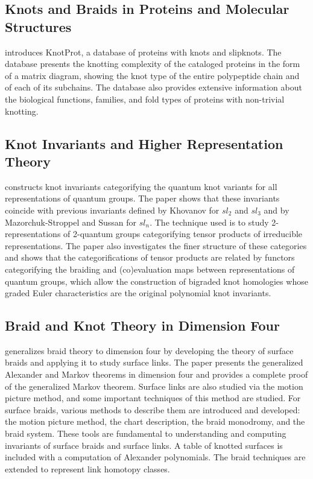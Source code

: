 \documentclass{article}
\begin{document}
\subsection{Knots and Braids in Proteins and Molecular Structures}

\cite{Jamrz2014KnotProtAD} introduces KnotProt, a database of proteins with knots and slipknots. The database presents the knotting complexity of the cataloged proteins in the form of a matrix diagram, showing the knot type of the entire polypeptide chain and of each of its subchains. The database also provides extensive information about the biological functions, families, and fold types of proteins with non-trivial knotting.

\subsection{Knot Invariants and Higher Representation Theory}

\cite{Webster2013KnotIA} constructs knot invariants categorifying the quantum knot variants for all representations of quantum groups. The paper shows that these invariants coincide with previous invariants defined by Khovanov for $sl_2$ and $sl_3$ and by Mazorchuk-Stroppel and Sussan for $sl_n$. The technique used is to study 2-representations of 2-quantum groups categorifying tensor products of irreducible representations. The paper also investigates the finer structure of these categories and shows that the categorifications of tensor products are related by functors categorifying the braiding and (co)evaluation maps between representations of quantum groups, which allow the construction of bigraded knot homologies whose graded Euler characteristics are the original polynomial knot invariants.

\subsection{Braid and Knot Theory in Dimension Four}

\cite{Kamada2002BraidAK} generalizes braid theory to dimension four by developing the theory of surface braids and applying it to study surface links. The paper presents the generalized Alexander and Markov theorems in dimension four and provides a complete proof of the generalized Markov theorem. Surface links are also studied via the motion picture method, and some important techniques of this method are studied. For surface braids, various methods to describe them are introduced and developed: the motion picture method, the chart description, the braid monodromy, and the braid system. These tools are fundamental to understanding and computing invariants of surface braids and surface links. A table of knotted surfaces is included with a computation of Alexander polynomials. The braid techniques are extended to represent link homotopy classes.
\end{document}
